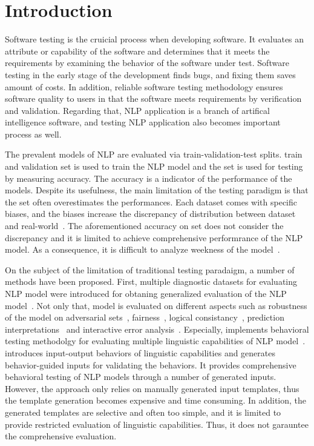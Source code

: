 \section{Introduction}
\label{sec:intro}

Software testing is the cruicial process when developing software.  It
evaluates an attribute or capability of the software and determines
that it meets the requirements by examining the behavior of the
software under test. Software testing in the early stage of the
development finds bugs, and fixing them saves amount of costs. In
addition, reliable software testing methodology ensures software
quality to users in that the software meets requirements by
verification and validation. Regarding that, NLP application is a
branch of artifical intelligence software, and testing NLP application
also becomes important process as well.

The prevalent models of NLP are evaluated via train-validation-test
splits. train and validation set is used to train the NLP model and
the \ho set is used for testing by measuring accuracy. The accuracy is
a indicator of the performance of the models. Despite its usefulness,
the main limitation of the testing paradigm is that the \ho set often
overestimates the performances. Each dataset comes with specific
biases, and the biases increase the discrepancy of distribution
between dataset and real-world~\cite{recht2019imagenetbias}. The
aforementioned accuracy on \ho set does not consider the discrepancy
and it is limited to achieve comprehensive performrance of the NLP
model. As a consequence, it is difficult to analyze weekness of the
model~\cite{wu2019errudite}.

On the subject of the limitation of traditional testing paradaigm, a
number of methods have been proposed. First, multiple diagnostic
datasets for evaluating NLP model were introduced for obtaning
generalized evaluation of the NLP model~\cite{wang2018glue}. Not only
that, model is evaluated on different aspects such as robustness of
the model on adversarial
sets~\cite{ribeiro2018sear,belinkov2018breaknmt,
  rychalska2019wildnlp,iyyer2018adversarial},
fairness~\cite{prabhakaran2019fairness,rottger2020hatecheck}, logical
consistancy~\cite{ribeiro2019consistencyeval}, prediction
interpretations~\cite{ribeiroSG16lime} and interactive error
analysis~\cite{wu2019errudite}. Especially, \Chlst implements
behavioral testing methodolgy for evaluating multiple linguistic
capabilities of NLP model~\cite{marcoACL2020checklist}. \Chlst
introduces input-output behaviors of linguistic capabilities and
generates behavior-guided inputs for validating the behaviors. It
provides comprehensive behavioral testing of NLP models through a
number of generated inputs. However, the approach only relies on
manually generated input templates, thus the template generation
becomes expensive and time consuming. In addition, the generated
templates are selective and often too simple, and it is limited to
provide restricted evaluation of linguistic capabilities. Thus, it
does not garauntee the comprehensive evaluation.

